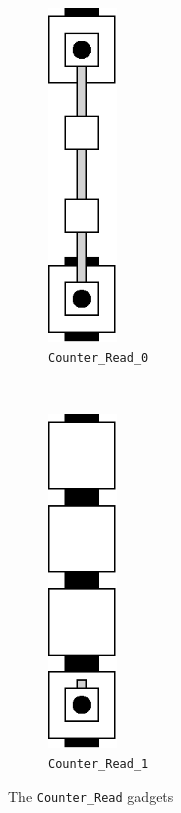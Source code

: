 \begin{figure}[H]
    \centering
    \begin{subfigure}[t]{0.2\textwidth}
        \centering
        \includegraphics[width=0.2\textwidth]{counter_read_0}
        \caption{\label{fig:counter_read_0} {\tt Counter\_Read\_0}}
    \end{subfigure}%
    ~
    \begin{subfigure}[t]{0.2\textwidth}
        \centering
        \includegraphics[width=0.2\textwidth]{counter_read_1}
        \caption{\label{fig:counter_read_1} {\tt Counter\_Read\_1}}
    \end{subfigure}%
    \caption{\label{fig:counter_read} The {\tt Counter\_Read} gadgets}
\end{figure}
